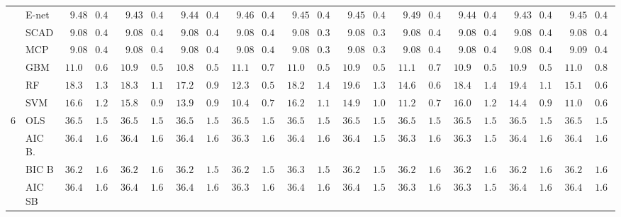 \begin{tabular}{llllllllllllllllllllll}
	& E-net  & $\phantom{0}9.48$ & $0.44$ & $\phantom{0}9.43$ & $0.44$ & $\phantom{0}9.44$ & $0.46$ & $\phantom{0}9.46$ & $0.42$ & $\phantom{0}9.45$ & $0.45$ & $\phantom{0}9.45$ & $0.45$ & $\phantom{0}9.49$ & $0.43$ & $\phantom{0}9.44$ & $0.46$ & $\phantom{0}9.43$ & $0.46$ & $\phantom{0}9.45$ & $0.43$ \\
	& SCAD  & $\phantom{0}9.08$ & $0.40$ & $\phantom{0}9.08$ & $0.40$ & $\phantom{0}9.08$ & $0.40$ & $\phantom{0}9.08$ & $0.40$ & $\phantom{0}9.08$ & $0.39$ & $\phantom{0}9.08$ & $0.39$ & $\phantom{0}9.08$ & $0.40$ & $\phantom{0}9.08$ & $0.40$ & $\phantom{0}9.08$ & $0.40$ & $\phantom{0}9.08$ & $0.40$ \\
	& MCP  & $\phantom{0}9.08$ & $0.41$ & $\phantom{0}9.08$ & $0.40$ & $\phantom{0}9.08$ & $0.40$ & $\phantom{0}9.08$ & $0.41$ & $\phantom{0}9.08$ & $0.39$ & $\phantom{0}9.08$ & $0.39$ & $\phantom{0}9.08$ & $0.40$ & $\phantom{0}9.08$ & $0.40$ & $\phantom{0}9.08$ & $0.40$ & $\phantom{0}9.09$ & $0.40$ \\
	& GBM  & $11.01$ & $0.60$ & $10.98$ & $0.53$ & $10.89$ & $0.54$ & $11.16$ & $0.78$ & $11.00$ & $0.54$ & $10.97$ & $0.53$ & $11.16$ & $0.77$ & $10.96$ & $0.59$ & $10.98$ & $0.57$ & $11.08$ & $0.83$ \\
	& RF  & $18.32$ & $1.33$ & $18.35$ & $1.12$ & $17.22$ & $0.99$ & $12.38$ & $0.58$ & $18.25$ & $1.43$ & $19.68$ & $1.31$ & $14.60$ & $0.69$ & $18.40$ & $1.40$ & $19.47$ & $1.18$ & $15.10$ & $0.68$ \\
	& SVM  & $16.69$ & $1.28$ & $15.84$ & $0.99$ & $13.96$ & $0.93$ & $10.46$ & $0.77$ & $16.21$ & $1.12$ & $14.96$ & $1.09$ & $11.24$ & $0.77$ & $16.03$ & $1.20$ & $14.40$ & $0.91$ & $11.09$ & $0.67$ \\
	6 & OLS  & $36.50$ & $1.59$ & $36.50$ & $1.59$ & $36.50$ & $1.59$ & $36.50$ & $1.59$ & $36.50$ & $1.59$ & $36.50$ & $1.59$ & $36.50$ & $1.59$ & $36.50$ & $1.59$ & $36.50$ & $1.59$ & $36.50$ & $1.59$ \\
	& AIC B.  & $36.41$ & $1.60$ & $36.41$ & $1.61$ & $36.41$ & $1.60$ & $36.39$ & $1.61$ & $36.41$ & $1.60$ & $36.42$ & $1.59$ & $36.39$ & $1.62$ & $36.39$ & $1.59$ & $36.41$ & $1.61$ & $36.40$ & $1.60$ \\
	& BIC B  & $36.28$ & $1.60$ & $36.26$ & $1.62$ & $36.28$ & $1.59$ & $36.26$ & $1.59$ & $36.30$ & $1.58$ & $36.29$ & $1.58$ & $36.29$ & $1.61$ & $36.29$ & $1.60$ & $36.28$ & $1.60$ & $36.28$ & $1.61$ \\
	& AIC SB  & $36.41$ & $1.60$ & $36.41$ & $1.61$ & $36.41$ & $1.60$ & $36.39$ & $1.61$ & $36.41$ & $1.60$ & $36.42$ & $1.59$ & $36.39$ & $1.62$ & $36.39$ & $1.59$ & $36.41$ & $1.61$ & $36.40$ & $1.60$ \\

\end{tabular}
